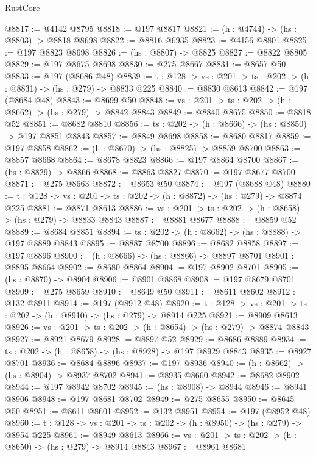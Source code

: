 \begin{lexlean}{RustCore}
\begin{coremodule}
@8817 := @4142 @8795
@8818 := @197 @8817
@8821 := (h : @4744) -> (hs : @8803) -> @8818 @8698
@8822 := @8816 @6935
@8823 := @4156 @8801
@8825 := @197 @8823 @8698
@8826 := (hs : @8807) -> @8825
@8827 := @8822 @8805
@8829 := @197 @8675 @8698
@8830 := @275 @8667
@8831 := @8657 @50
@8833 := @197 (@8686 @48)
@8839 := {t : @128} -> {vs : @201} -> {ts : @202} -> (h : @8831) -> (hs : @279) -> @8833 @225
@8840 := @8830 @8613
@8842 := @197 (@8684 @48)
@8843 := @8699 @50
@8848 := {vs : @201} -> {ts : @202} -> (h : @8662) -> (hs : @279) -> @8842 @8843
@8849 := @8840 @8675
@8850 := @8818 @52
@8851 := @8682 @8810
@8856 := {ts : @202} -> (h : @8666) -> (hs : @8850) -> @197 @8851 @8843
@8857 := @8849 @8698
@8858 := @8680 @8817
@8859 := @197 @8858
@8862 := (h : @8670) -> (hs : @8825) -> @8859 @8700
@8863 := @8857 @8668
@8864 := @8678 @8823
@8866 := @197 @8864 @8700
@8867 := (hs : @8829) -> @8866
@8868 := @8863 @8827
@8870 := @197 @8677 @8700
@8871 := @275 @8663
@8872 := @8653 @50
@8874 := @197 (@8688 @48)
@8880 := {t : @128} -> {vs : @201} -> {ts : @202} -> (h : @8872) -> (hs : @279) -> @8874 @225
@8881 := @8871 @8613
@8886 := {vs : @201} -> {ts : @202} -> (h : @8658) -> (hs : @279) -> @8833 @8843
@8887 := @8881 @8677
@8888 := @8859 @52
@8889 := @8684 @8851
@8894 := {ts : @202} -> (h : @8662) -> (hs : @8888) -> @197 @8889 @8843
@8895 := @8887 @8700
@8896 := @8682 @8858
@8897 := @197 @8896
@8900 := (h : @8666) -> (hs : @8866) -> @8897 @8701
@8901 := @8895 @8664
@8902 := @8680 @8864
@8904 := @197 @8902 @8701
@8905 := (hs : @8870) -> @8904
@8906 := @8901 @8868
@8908 := @197 @8679 @8701
@8909 := @275 @8659
@8910 := @8649 @50
@8911 := @8611 @8602
@8912 := @132 @8911
@8914 := @197 (@8912 @48)
@8920 := {t : @128} -> {vs : @201} -> {ts : @202} -> (h : @8910) -> (hs : @279) -> @8914 @225
@8921 := @8909 @8613
@8926 := {vs : @201} -> {ts : @202} -> (h : @8654) -> (hs : @279) -> @8874 @8843
@8927 := @8921 @8679
@8928 := @8897 @52
@8929 := @8686 @8889
@8934 := {ts : @202} -> (h : @8658) -> (hs : @8928) -> @197 @8929 @8843
@8935 := @8927 @8701
@8936 := @8684 @8896
@8937 := @197 @8936
@8940 := (h : @8662) -> (hs : @8904) -> @8937 @8702
@8941 := @8935 @8660
@8942 := @8682 @8902
@8944 := @197 @8942 @8702
@8945 := (hs : @8908) -> @8944
@8946 := @8941 @8906
@8948 := @197 @8681 @8702
@8949 := @275 @8655
@8950 := @8645 @50
@8951 := @8611 @8601
@8952 := @132 @8951
@8954 := @197 (@8952 @48)
@8960 := {t : @128} -> {vs : @201} -> {ts : @202} -> (h : @8950) -> (hs : @279) -> @8954 @225
@8961 := @8949 @8613
@8966 := {vs : @201} -> {ts : @202} -> (h : @8650) -> (hs : @279) -> @8914 @8843
@8967 := @8961 @8681

\end{coremodule}
\end{lexlean}

